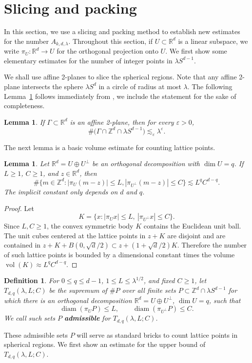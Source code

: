 \documentclass[11pt,reqno]{amsart}
\newtheorem{definition}[theorem]{Definition}
\newtheorem{lemma}[theorem]{Lemma}
\numberwithin{equation}{section}
\newcommand{\1}{\textbf{1}}
\newcommand{\ls}{\lesssim}
\newcommand{\R}{\mathbb R}
\newcommand{\Z}{\mathbb Z}
\newcommand{\eps}{\varepsilon}
\newcommand{\la}{\lambda}
\DeclareMathOperator{\vol}{vol}
\begin{document}
	\section{Slicing and packing}\label{sec3}
	
	In this section, we use a slicing and packing method to establish new estimates for the number $A_{k,d,\la}$. Throughout this section, if $U\subset\R^d$ is a linear subspace, we write
	$\pi_U:\R^d\to U$ for the orthogonal projection onto $U$. We first show some elementary estimates for the number of integer points in $\lambda S^{d-1}$. 
	
	We shall use affine 2-planes to slice the spherical regions. Note that any affine 2-plane intersects the sphere $\la S^d$ in a circle of radius at most $\la$. The following Lemma~\ref{lem:two-parameter-sphere} follows immediately from \cite[Lemma~4]{hzapde}, we include the statement for the sake of completeness.
	
	\begin{lemma}\label{lem:two-parameter-sphere}
		If $\Gamma\subset \mathbb{R}^d$ is an affine 2-plane, then for every $\eps>0$,
		\begin{equation}\label{eq:rank-two-section}
			\#\bigl(\Gamma\cap\Z^d\cap\lambda S^{d-1}\bigr)\ls_\eps \lambda^\eps.
		\end{equation}
	\end{lemma}
	The next lemma is a basic volume estimate for counting lattice points.
	\begin{lemma}\label{lem:rotated-box}
		Let \(\R^d=U\oplus U^\perp\) be an orthogonal decomposition with \(\dim U=q\).  If
		\(L\ge1\), \(C\ge1\), and \(z\in\R^d\), then
		\[
		\#\{m\in\Z^d:|\pi_U(m-z)|\le L,
		|\pi_{U^\perp}(m-z)|\le C\}
		\ls L^q C^{d-q}.
		\]
		The implicit constant only depends on $d$ and $q$.
	\end{lemma}
	
	\begin{proof}
		Let
		\[
		K=\{x:|\pi_Ux|\le L,\ |\pi_{U^\perp}x|\le C\}.
		\]
		Since \(L,C\ge1\), the convex symmetric body \(K\) contains the Euclidean unit
		ball.  The unit cubes centered at the lattice points in \(z+K\) are disjoint and
		are contained in \(z+K+B(0,\sqrt d/2)\subset z+(1+\sqrt d/2)K\). Therefore the
		number of such lattice points is bounded by a dimensional constant times the volume
		\(\vol(K)\approx L^qC^{d-q}\).
	\end{proof}
	\begin{definition}\label{def:T}{\rm 
			For \(0\le q\le d-1\), \(1\le L\le\la^{1/2}\), and fixed \(C\ge1\), let
			\(T_{d,q}(\la,L;C)\) be the supremum of \(\#P\) over all finite sets
			\(P\subset\Z^d\cap\la S^{d-1}\) for which there is an orthogonal decomposition
			\(\R^d=U\oplus U^\perp\), \(\dim U=q\), such that
			\[
			\operatorname{diam}(\pi_UP)\le L,
			\qquad
			\operatorname{diam}(\pi_{U^\perp}P)\le C.
			\]
			We call such sets $P$  \textbf{admissible} for \(T_{d,q}(\la,L;C)\).}
	\end{definition}
	These admissible sets $P$ will serve as standard bricks to count lattice points in spherical regions. We first show an estimate for the upper bound of \(T_{d,q}(\la,L;C)\). 
	
\end{document}
